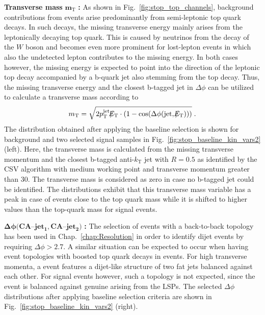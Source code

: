 \begin{description}
 \item \textbf{Transverse mass} $\mathbf{m_\mathrm{T}}$ \textbf{:} As shown in Fig.~\ref{fig:stop_top_channels}, background contributions from \ttbar events arise predominantly from semi-leptonic top quark decays. In such decays, the missing transverse energy mainly arises from the leptonically decaying top quark. This is caused by neutrinos from the decay of the $W$ boson and becomes even more prominent for lost-lepton events in which also the undetected lepton contributes to the missing energy. In both cases however, the missing energy is expected to point into the direction of the leptonic top decay accompanied by a b-quark jet also stemming from the top decay. Thus, the missing transverse energy and the closest b-tagged jet in $\Delta \phi$ can be utilized to calculate a transverse mass according to
\begin{equation}
m_\mathrm{T} = \sqrt{2 p_{\text{T}}^\mathrm{jet}\slash\mkern-12mu{E}_{\text{T}} \cdot (1-\mathrm{cos}(\Delta \phi(\mathrm{jet}, \slash\mkern-12mu{E}_{\text{T}})))} \; .
\end{equation}   
The distribution obtained after applying the baseline selection is shown for background and two selected signal samples in Fig.~\ref{fig:stop_baseline_kin_vars2} (left). Here, the transverse mass is calculated from the missing transverse momentum and the closest b-tagged anti-$k_\mathrm{T}$ jet with $R = 0.5$ as identified by the CSV algorithm with medium working point and transverse momentum greater than 30\gev. The transverse mass is considered as zero in case no b-tagged jet could be identified. The distributions exhibit that this transverse mass variable has a peak in case of \ttbar events close to the top quark mass while it is shifted to higher values than the top-quark mass for signal events. 
 \item $\mathbf{\Delta \phi(CA}$--$\mathbf{jet_1, CA}$--$\mathbf{jet_2)}$ \textbf{:} The selection of events with a back-to-back topology has been used in Chap.~\ref{chap:Resolution} in order to identify dijet events by requiring $\Delta \phi > 2.7$. A similar situation can be expected to occur when having event topologies with boosted top quark decays in \ttbar events. For high transverse momenta, a \ttbar event features a dijet-like structure of two fat jets balanced against each other. For signal events however, such a topology is not expected, since the event is balanced against genuine \met arising from the LSPs. The selected $\Delta \phi$ distributions after applying baseline selection criteria are shown in Fig.~\ref{fig:stop_baseline_kin_vars2} (right).  
\end{description}
